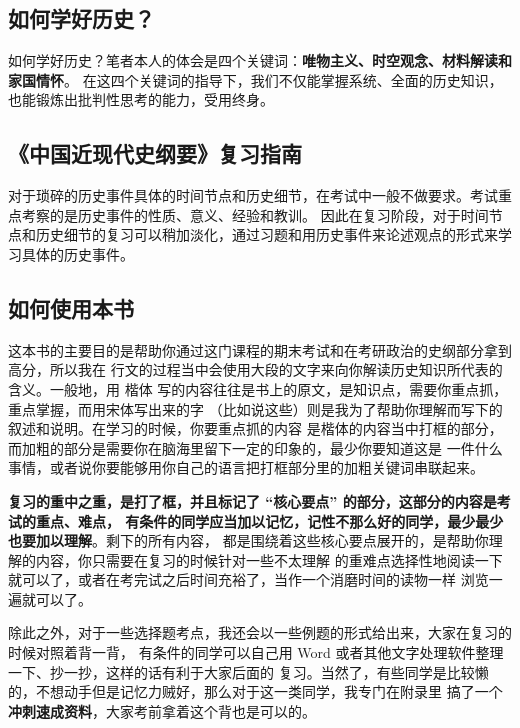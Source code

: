 \documentclass[10pt, UTF8]{ctexbook} %
\begin{document}
\subsection*{如何学好历史？}
\setcounter{subsubsection}{0}

如何学好历史？笔者本人的体会是四个关键词：\textbf{唯物主义、时空观念、材料解读和家国情怀}。
在这四个关键词的指导下，我们不仅能掌握系统、全面的历史知识，也能锻炼出批判性思考的能力，受用终身。

\subsection*{《中国近现代史纲要》复习指南}
\setcounter{subsubsection}{0}

对于琐碎的历史事件具体的时间节点和历史细节，在考试中一般不做要求。考试重点考察的是历史事件的性质、意义、经验和教训。
因此在复习阶段，对于时间节点和历史细节的复习可以稍加淡化，通过习题和用历史事件来论述观点的形式来学习具体的历史事件。

\subsection*{如何使用本书}
\setcounter{subsubsection}{0}

这本书的主要目的是帮助你通过这门课程的期末考试和在考研政治的史纲部分拿到高分，所以我在
行文的过程当中会使用大段的文字来向你解读历史知识所代表的含义。一般地，用 \kaishu 楷体
\songti 写的内容往往是书上的原文，是知识点，需要你重点抓，重点掌握，而用宋体写出来的字
（比如说这些）则是我为了帮助你理解而写下的叙述和说明。在学习的时候，你要重点抓的内容
是楷体的内容当中打框的部分，而加粗的部分是需要你在脑海里留下一定的印象的，最少你要知道这是
一件什么事情，或者说你要能够用你自己的语言把打框部分里的加粗关键词串联起来。

\textbf{复习的重中之重，是打了框，并且标记了 “核心要点” 的部分，这部分的内容是考试的重点、难点，
有条件的同学应当加以记忆，记性不那么好的同学，最少最少也要加以理解}。剩下的所有内容，
都是围绕着这些核心要点展开的，是帮助你理解的内容，你只需要在复习的时候针对一些不太理解
的重难点选择性地阅读一下就可以了，或者在考完试之后时间充裕了，当作一个消磨时间的读物一样
浏览一遍就可以了。

除此之外，对于一些选择题考点，我还会以一些例题的形式给出来，大家在复习的时候对照着背一背，
有条件的同学可以自己用 Word 或者其他文字处理软件整理一下、抄一抄，这样的话有利于大家后面的
复习。当然了，有些同学是比较懒的，不想动手但是记忆力贼好，那么对于这一类同学，我专门在附录里
搞了一个\textbf{冲刺速成资料}，大家考前拿着这个背也是可以的。
\end{document}
